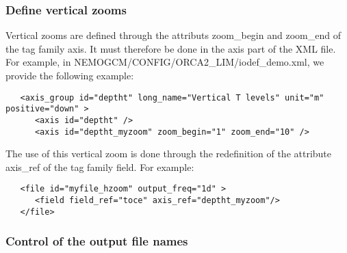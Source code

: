 \documentclass[NEMO_book]{subfiles}
\begin{document}
\subsubsection{Define vertical zooms}
Vertical zooms are defined through the attributs zoom\_begin and zoom\_end of the tag family axis. It must therefore be done in the axis part of the XML file. For example, in NEMOGCM/CONFIG/ORCA2\_LIM/iodef\_demo.xml, we provide the following example:
\vspace{-20pt}
\begin{alltt}  {{\scriptsize
\begin{verbatim}
   <axis_group id="deptht" long_name="Vertical T levels" unit="m" positive="down" >
      <axis id="deptht" />
      <axis id="deptht_myzoom" zoom_begin="1" zoom_end="10" />
\end{verbatim}
}}\end{alltt} 
The use of this vertical zoom is done through the redefinition of the attribute axis\_ref of the tag family field. For example:
\vspace{-20pt}
\begin{alltt}  {{\scriptsize
\begin{verbatim}
   <file id="myfile_hzoom" output_freq="1d" >
      <field field_ref="toce" axis_ref="deptht_myzoom"/>
   </file>
\end{verbatim}
}}\end{alltt} 

\subsubsection{Control of the output file names}
\end{document}
